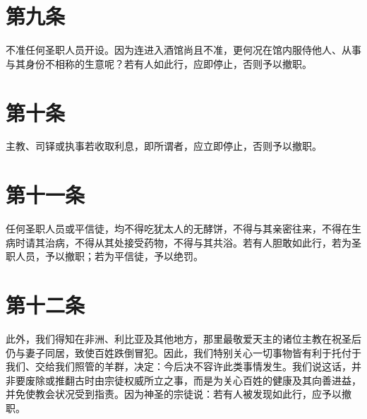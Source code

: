 
\section{第九条}

不准任何圣职人员开设。因为连进入酒馆尚且不准，更何况在馆内服侍他人、从事与其身份不相称的生意呢？若有人如此行，应即停止，否则予以撤职。\par


\section{第十条}

主教、司铎或执事若收取利息，即所谓者，应立即停止，否则予以撤职。\par


\section{第十一条}

任何圣职人员或平信徒，均不得吃犹太人的无酵饼，不得与其亲密往来，不得在生病时请其治病，不得从其处接受药物，不得与其共浴。若有人胆敢如此行，若为圣职人员，予以撤职；若为平信徒，予以绝罚。\par


\section{第十二条}

此外，我们得知在非洲、利比亚及其他地方，那里最敬爱天主的诸位主教在祝圣后仍与妻子同居，致使百姓跌倒冒犯。因此，我们特别关心一切事物皆有利于托付于我们、交给我们照管的羊群，决定：今后决不容许此类事情发生。我们说这话，并非要废除或推翻古时由宗徒权威所立之事，而是为关心百姓的健康及其向善进益，并免使教会状况受到指责。因为神圣的宗徒说：若有人被发现如此行，应予以撤职。\par

